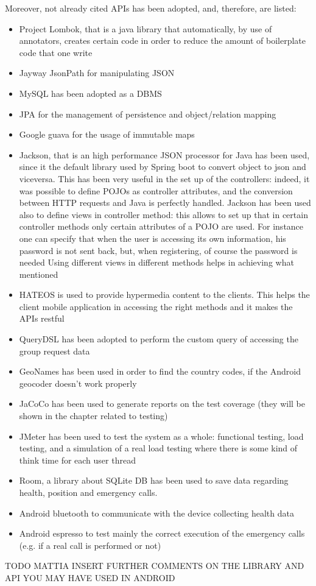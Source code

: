 Moreover, not already cited APIs has been adopted, and, therefore, are listed: 

\begin{itemize}
\item Project Lombok, that is a java library that automatically, by use of annotators, creates certain code in order to reduce the amount
of boilerplate code that one write 
\item Jayway JsonPath for manipulating JSON 
\item MySQL has been adopted as a DBMS
\item JPA for the management of persistence and object/relation mapping
\item Google guava for the usage of immutable maps
\item Jackson, that is an high performance JSON processor for Java has been used, since it the default library used by Spring boot 
to convert object to json and viceversa. 
This has been very useful in the set up of the controllers: indeed, it was possible to define POJOs as controller attributes, and the conversion between HTTP requests and Java is perfectly handled. 
Jackson has been used also to define views in controller method: this allows to set up that in certain controller methods only certain attributes of a POJO are used. 
For instance one can specify that when the user is accessing its own information, his password is not sent back, but, when registering, of course the password is needed
Using different views in different methods helps in achieving what mentioned 
\item HATEOS is used to provide hypermedia content to the clients. This helps the client mobile application in accessing the right methods 
and it makes the APIs restful
\item QueryDSL has been adopted to perform the custom query of accessing the group request data
\item GeoNames has been used in order to find the country codes, if the Android geocoder doesn't work properly
\item JaCoCo has been used to generate reports on the test coverage (they will be shown in the chapter related to testing)
\item JMeter has been used to test the system as a whole: functional testing, load testing, and a simulation of a real load testing where there is some kind of think time for each user thread
\item Room, a library about SQLite DB has been used to save data regarding health, position and emergency calls.
\item Android bluetooth to communicate with the device collecting health data
\item Android espresso to test mainly the correct execution of the emergency calls (e.g. if a real call is performed or not)
\end{itemize}

TODO MATTIA INSERT FURTHER COMMENTS ON THE LIBRARY AND API YOU MAY HAVE USED IN ANDROID